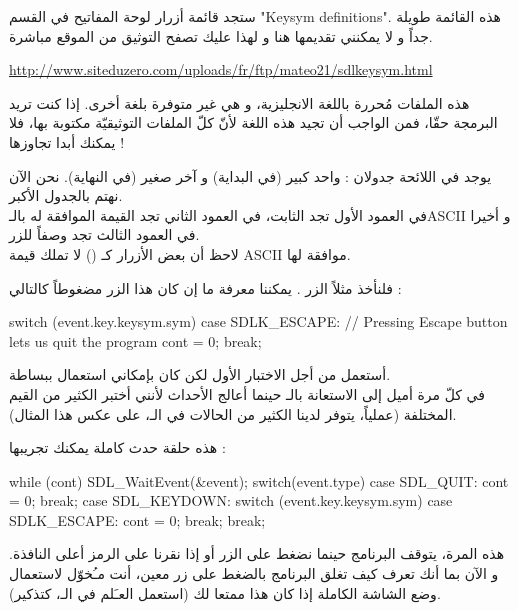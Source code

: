 ستجد قائمة أزرار لوحة المفاتيح في القسم
"\textenglish{Keysym definitions}".
هذه القائمة طويلة جداً و لا يمكنني تقديمها هنا و لهذا عليك تصفح التوثيق من الموقع مباشرة.

\url{http://www.siteduzero.com/uploads/fr/ftp/mateo21/sdlkeysym.html}

هذه الملفات مُحررة باللغة الانجليزية، و هي غير متوفرة بلغة أخرى. إذا كنت تريد البرمجة حقّا، فمن الواجب أن تجيد هذه اللغة لأنّ  كلّ الملفات التوثيقيّة مكتوبة بها، فلا يمكنك أبدا تجاوزها !

يوجد في اللائحة جدولان : واحد كبير (في البداية) و آخر صغير (في النهاية). نحن الآن نهتم بالجدول الأكبر.\\
في العمود الأول تجد الثابت، في العمود الثاني تجد القيمة الموافقة له بالـ\textenglish{ASCII}
و أخيرا في العمود الثالث تجد وصفاً للزر.\\
لاحظ أن بعض الأزرار كـ
()
لا تملك قيمة
\textenglish{ASCII}
موافقة لها.

فلنأخذ مثلاً الزر
.
يمكننا معرفة ما إن كان هذا الزر مضغوطاً كالتالي :

\begin{Csource}
switch (event.key.keysym.sym)
{
	case SDLK_ESCAPE: // Pressing Escape button lets us quit the program
	cont = 0;
	break;
}
\end{Csource}

\begin{information}
أستعمل
من أجل الاختبار الأول لكن كان بإمكاني استعمال
ببساطة.\\
في كلّ مرة أميل إلى الاستعانة بالـ
حينما أعالج الأحداث لأنني أختبر الكثير من القيم المختلفة (عملياً، يتوفر لدينا الكثير من الحالات في الـ،
على عكس هذا المثال).
\end{information}

هذه حلقة حدث كاملة يمكنك تجريبها :

\begin{Csource}
while (cont)
{
	SDL_WaitEvent(&event);
	switch(event.type)
	{
		case SDL_QUIT:
		cont = 0;
		break;
		case SDL_KEYDOWN:
		switch (event.key.keysym.sym)
		{
			case SDLK_ESCAPE: 
			cont = 0;
			break;
		}
		break;
	}
}
\end{Csource}

\begin{information}
هذه المرة، يتوقف البرنامج حينما نضغط على الزر
أو إذا نقرنا على الرمز
أعلى النافذة. و الآن بما أنك تعرف كيف تغلق البرنامج بالضغط على زر معين، أنت مـُخوّل لاستعمال وضع الشاشة الكاملة إذا كان هذا ممتعا لك (استعمل العـَلم
في الـ،
كتذكير).
\end{information}

